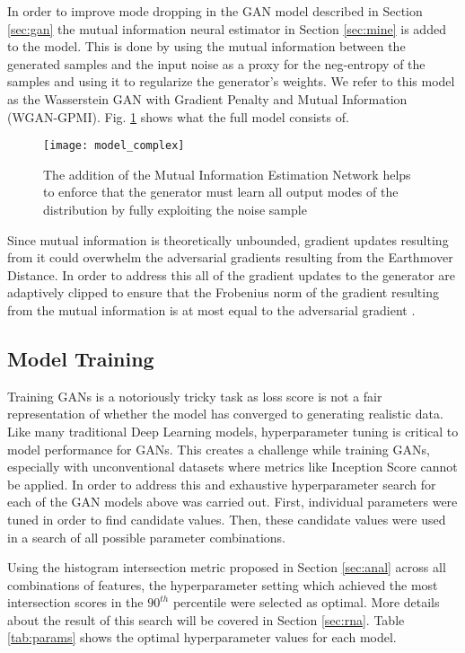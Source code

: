 In order to improve mode dropping in the GAN model described in Section \ref{sec:gan} the mutual information neural estimator in Section \ref{sec:mine} is added to the model. This is done by using the mutual information between the generated samples and the input noise as a proxy for the neg-entropy of the samples and using it to regularize the generator's weights. We refer to this model as the Wasserstein GAN with Gradient Penalty and Mutual Information (WGAN-GPMI). Fig. \ref{fig:model_complex} shows what the full model consists of. 

\begin{figure}[!htbp]
	\centering%
	\texttt{[image: model\_complex]}
	\caption{
		The addition of the Mutual Information Estimation Network helps to enforce that the generator must learn all output modes of the distribution by fully exploiting the noise sample
	}
	\label{fig:model_complex}
\end{figure}

Since mutual information is theoretically unbounded, gradient updates resulting from it could overwhelm the adversarial gradients resulting from the Earthmover Distance. In order to address this all of the gradient updates to the generator are adaptively clipped to ensure that the Frobenius norm of the gradient resulting from the mutual information is at most equal to the adversarial gradient \cite{Belghazi2018}.


\subsection{Model Training}
\label{sec:training}

Training GANs is a notoriously tricky task as loss score is not a fair representation of whether the model has converged to generating realistic data. Like many traditional Deep Learning models, hyperparameter tuning is critical to model performance for GANs. This creates a challenge while training GANs, especially with unconventional datasets where metrics like Inception Score cannot be applied. In order to address this and exhaustive hyperparameter search for each of the GAN models above was carried out. First, individual parameters were tuned in order to find candidate values. Then, these candidate values were used in a search of all possible parameter combinations.

Using the histogram intersection metric proposed in Section \ref{sec:anal} across all combinations of features, the hyperparameter setting which achieved the most intersection scores in the $90^{th}$ percentile were selected as optimal. More details about the result of this search will be covered in Section \ref{sec:rna}. Table \ref{tab:params} shows the optimal hyperparameter values for each model.


